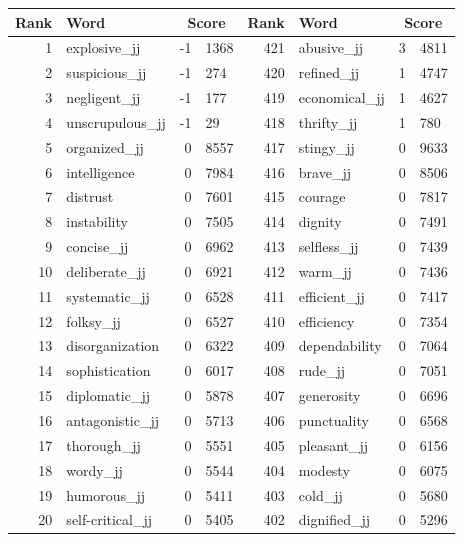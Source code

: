 \begin{table}[tbp]
    \begin{tabular}{| rlr@{.}l | rlr@{.}l |}
    \hline
    \textbf{Rank} & \textbf{Word} & \multicolumn{2}{c|}{\textbf{Score}} & \textbf{Rank} & \textbf{Word} & \multicolumn{2}{c|}{\textbf{Score}} \\
    \hline
    1 & explosive\_jj & -1 & 1368    &    421 & abusive\_jj & 3 & 4811 \\
    2 & suspicious\_jj & -1 & 274    &    420 & refined\_jj & 1 & 4747 \\
    3 & negligent\_jj & -1 & 177    &    419 & economical\_jj & 1 & 4627 \\
    4 & unscrupulous\_jj & -1 & 29    &    418 & thrifty\_jj & 1 & 780 \\
    5 & organized\_jj & 0 & 8557    &    417 & stingy\_jj & 0 & 9633 \\
    6 & intelligence & 0 & 7984    &    416 & brave\_jj & 0 & 8506 \\
    7 & distrust & 0 & 7601    &    415 & courage & 0 & 7817 \\
    8 & instability & 0 & 7505    &    414 & dignity & 0 & 7491 \\
    9 & concise\_jj & 0 & 6962    &    413 & selfless\_jj & 0 & 7439 \\
    10 & deliberate\_jj & 0 & 6921    &    412 & warm\_jj & 0 & 7436 \\
    11 & systematic\_jj & 0 & 6528    &    411 & efficient\_jj & 0 & 7417 \\
    12 & folksy\_jj & 0 & 6527    &    410 & efficiency & 0 & 7354 \\
    13 & disorganization & 0 & 6322    &    409 & dependability & 0 & 7064 \\
    14 & sophistication & 0 & 6017    &    408 & rude\_jj & 0 & 7051 \\
    15 & diplomatic\_jj & 0 & 5878    &    407 & generosity & 0 & 6696 \\
    16 & antagonistic\_jj & 0 & 5713    &    406 & punctuality & 0 & 6568 \\
    17 & thorough\_jj & 0 & 5551    &    405 & pleasant\_jj & 0 & 6156 \\
    18 & wordy\_jj & 0 & 5544    &    404 & modesty & 0 & 6075 \\
    19 & humorous\_jj & 0 & 5411    &    403 & cold\_jj & 0 & 5680 \\
    20 & self-critical\_jj & 0 & 5405    &    402 & dignified\_jj & 0 & 5296 \\

\end{tabular}
\end{table}
